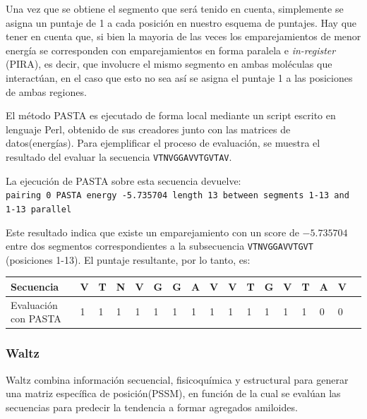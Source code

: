 Una vez que se obtiene el segmento que será tenido en cuenta, simplemente se asigna un puntaje de 1 a cada posición en nuestro esquema de puntajes.
Hay que tener en cuenta que, si bien la mayoria de las veces los emparejamientos de menor energía se corresponden con emparejamientos en forma paralela e \textit{in-register} (PIRA), es decir, 
que involucre el mismo segmento en ambas moléculas que interactúan, en el caso que esto no sea así se asigna el puntaje 1 a las posiciones de ambas regiones. 

El método PASTA es ejecutado de forma local mediante un script escrito en lenguaje Perl, obtenido de sus creadores junto con las matrices de datos(energías).
Para ejemplificar el proceso de evaluación, se muestra el resultado del evaluar la secuencia \texttt{VTNVGGAVVTGVTAV}.

La ejecución de PASTA sobre esta secuencia devuelve: \\
\noindent
\texttt{pairing 0  PASTA energy -5.735704  length 13  between segments 1-13 and 1-13  parallel}

Este resultado indica que existe un emparejamiento con un score de $-5.735704$ entre dos segmentos correspondientes a la subsecuencia \texttt{VTNVGGAVVTGVT} (posiciones 1-13). 
El puntaje resultante, por lo tanto, es:

\vspace{0.5cm}
\noindent
\begin{tabular}{lllllllllllllllll} 
\hline    
Secuencia & \textbf{V} & \textbf{T} & \textbf{N} & \textbf{V} & \textbf{G} & \textbf{G} & \textbf{A} & \textbf{V} & \textbf{V} &\textbf{T} & \textbf{G} & \textbf{V} & \textbf{T} & \textbf{A} & \textbf{V} \\ \hline
Evaluación con PASTA & 1 & 1 & 1 & 1 & 1 & 1 & 1 & 1 & 1 & 1 & 1 & 1 & 1 & 0 & 0 \\ \hline
\end{tabular}





\subsubsection{Waltz}\label{waltz}

Waltz \cite{maurer2010exploring} combina información secuencial, fisicoquímica y estructural para generar una matriz específica de posición(PSSM),
en función de la cual se evalúan las secuencias para predecir la tendencia a formar agregados amiloides.

